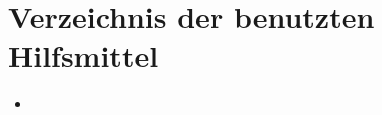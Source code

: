 \chapter{Verzeichnis der benutzten Hilfsmittel}

\begin{itemize}
    \item [Hilfsmittel hier eintragen.]
\end{itemize}
